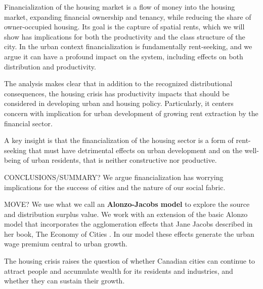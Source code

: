 
Financialization of the housing market is a flow of money into the housing market, expanding financial ownership and tenancy, while reducing the share of owner-occupied housing. Its goal is the capture of spatial rents, which we will show has implications for both the productivity and the class structure of the city. 
In the urban context financialization is fundamentally \gls{rent-seeking}, and we argue it can have a profound impact on the system, including effects on both distribution and productivity. 

The analysis makes clear that in addition to the recognized distributional consequences, the housing crisis has productivity impacts that should be considered in developing urban and housing policy. Particularly, it centers concern with implication for urban development of growing rent extraction by the financial sector. 

A key insight is that the financialization of the housing sector is a form of \gls{rent-seeking} that must have detrimental effects on urban development and on the well-being of urban residents, that is neither constructive nor productive.

CONCLUSIONS/SUMMARY?
We argue financialization %
has worrying implications for the success of cities and the nature of our social fabric. 

MOVE? We use what we call an \textbf{\gls{Alonzo-Jacobs model}} to explore the source and distribution surplus value. We  work with an extension of the basic Alonzo model that incorporates the \gls{agglomeration effects} that Jane Jacobs  described in her book, The Economy of Cities \cite{jacobsEconomyCities1969}. In our model these effects generate the \gls{urban wage premium} central to urban growth. %

The housing crisis raises the question of whether Canadian cities can continue to attract people and accumulate wealth for its residents and industries, and whether they can sustain their growth.



